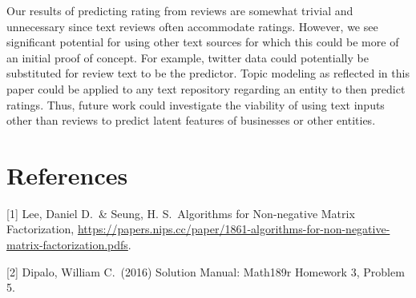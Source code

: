 \documentclass{article}
\begin{document}
Our results of predicting rating from reviews are somewhat trivial and unnecessary since text reviews often accommodate ratings.  However, we see significant potential for using other text sources for which this could be more of an initial proof of concept.  For example, twitter data could potentially be substituted for review text to be the predictor.  Topic modeling as reflected in this paper could be applied to any text repository regarding an entity to then predict ratings.  Thus, future work could investigate the viability of using text inputs other than reviews to predict latent features of businesses or other entities.  

\section*{References}

[1] Lee, Daniel D.\ \& Seung, H. S.\ Algorithms for Non-negative Matrix Factorization, \url{https://papers.nips.cc/paper/1861-algorithms-for-non-negative-matrix-factorization.pdfs}.

[2] Dipalo, William C.\  (2016) Solution Manual: Math189r Homework 3, Problem 5.
\end{document}
